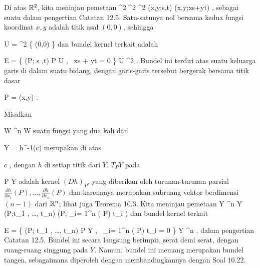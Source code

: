 {

Di atas ${\mathbb R}^2$, kita meninjau pemetaan
\maabbeledisp {} {\R^2 \times \R^2} { \R^2 \times \R
} {(x,y;s,t)} { (x,y;xs+yt)
} {,}
sebagai suatu
dalam pengertian
Catatan 12.5.
Satu-satunya nol bersama kedua fungsi koordinat $x,y$ adalah titik asal $(0,0)$, sehingga

\mavergleichskette
{\vergleichskette
{ U
}
{ = }{ \R^2 \setminus \{ (0,0) \}
}
{  }{
}
{    }{
}
{   }{
}
}
{}{}{}
dan bundel kernel terkait adalah

\mavergleichskettedisp
{\vergleichskette
{ E
}
{ =} { \left\{  (P; s ,t)   \mid   P \in U  , \,  xs + yt = 0       \right\}
}
{ \subseteq} { U \times \R^2
}
{ } {
}
{ } {
}
}
{}{}{.}
Bundel ini terdiri atas suatu keluarga garis di dalam suatu bidang, dengan garis-garis tersebut bergerak bersama titik dasar

\mavergleichskette
{\vergleichskette
{ P
}
{ = }{ (x,y)
}
{  }{
}
{    }{
}
{   }{
}
}
{}{}{}
.

}

{

Misalkan

\mavergleichskette
{\vergleichskette
{ W
}
{ \subseteq }{ \R^n
}
{  }{
}
{    }{
}
{   }{
}
}
{}{}{}
 { W } { \R
} {}
suatu fungsi yang dua kali
dan

\mavergleichskette
{\vergleichskette
{ Y
}
{ = }{ h^{-1}(c)
}
{  }{
}
{    }{
}
{   }{
}
}
{}{}{}
merupakan
di atas

\mavergleichskette
{\vergleichskette
{ c
}
{ \in }{ \R
}
{  }{
}
{    }{
}
{   }{
}
}
{}{}{,}
dengan $h$
di setiap titik dari $Y$. 
$T_PY$ pada

\mavergleichskette
{\vergleichskette
{ P
}
{ \in }{ Y
}
{  }{
}
{    }{
}
{   }{
}
}
{}{}{}
adalah kernel
$\left(D h \right)_{ P}$, yang diberikan oleh turunan-turunan parsial ${ \frac{   \partial   h   }{  \partial   x_1   } } ( P) , \ldots , { \frac{   \partial   h   }{  \partial   x_n   } } ( P)$ dan karenanya merupakan subruang vektor berdimensi $(n-1)$ dari ${\mathbb R}^n$; lihat juga
Teorema 10.3.
Kita meninjau pemetaan
\maabbeledisp {} {Y \times \R^n } { Y \times \R
} {(P;t_1 , \ldots , t_n) } { (P; \sum_{i= 1}^n {  } ( P)  t_i )
} {}
dan bundel kernel terkait

\mavergleichskettedisp
{\vergleichskette
{ E
}
{ =} { \left\{  (P; t_1 , \ldots , t_n)  \mid   P \in Y , \,  \sum_{i= 1}^n {  } ( P) t_i = 0       \right\}
}
{ \subseteq} { Y \times \R^n
}
{ } {
}
{ } {
}
}
{}{}{.}
dalam pengertian
Catatan 12.5.
Bundel ini secara langsung berimpit, serat demi serat, dengan ruang-ruang singgung pada $Y$. Namun, bundel ini memang merupakan bundel tangen, sebagaimana diperoleh dengan membandingkannya dengan
Soal 10.22.

}

